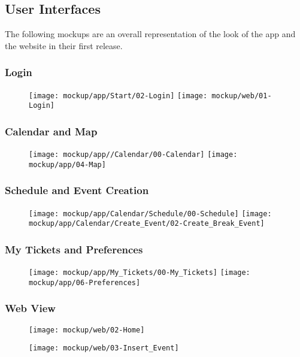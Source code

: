 \subsection{User Interfaces}
\label{subsect:User Interfaces}
	The following mockups are an overall representation of the look of the app and the website in their first release.
	\subsubsection{Login}
	\begin{figure}[H]
	\texttt{[image: mockup/app/Start/02-Login]}
	\vspace{2.5cm}
	\texttt{[image: mockup/web/01-Login]}
	\centering 
	\end{figure}
	
	\subsubsection{Calendar and Map}
	\begin{figure}[H]
	\texttt{[image: mockup/app//Calendar/00-Calendar]}
	\hspace{2.5cm}
	\texttt{[image: mockup/app/04-Map]}
	\centering 
	\end{figure}
	
	\subsubsection{Schedule and Event Creation}
	\begin{figure}[H]
	\texttt{[image: mockup/app/Calendar/Schedule/00-Schedule]}
	\hspace{2.5cm}
	\texttt{[image: mockup/app/Calendar/Create\_Event/02-Create\_Break\_Event]}
	\centering 
	\end{figure}
	
	\subsubsection{My Tickets and Preferences}
	\begin{figure}[H]
	\texttt{[image: mockup/app/My\_Tickets/00-My\_Tickets]}
	\hspace{2.5cm}
	\texttt{[image: mockup/app/06-Preferences]}
	\centering 
	\end{figure}
	
	\subsubsection{Web View}
	\begin{figure}[H]
	\texttt{[image: mockup/web/02-Home]}
	\centering
	\end{figure}
	\begin{figure}
	\texttt{[image: mockup/web/03-Insert\_Event]}
	\centering 
	\end{figure}
\newpage
